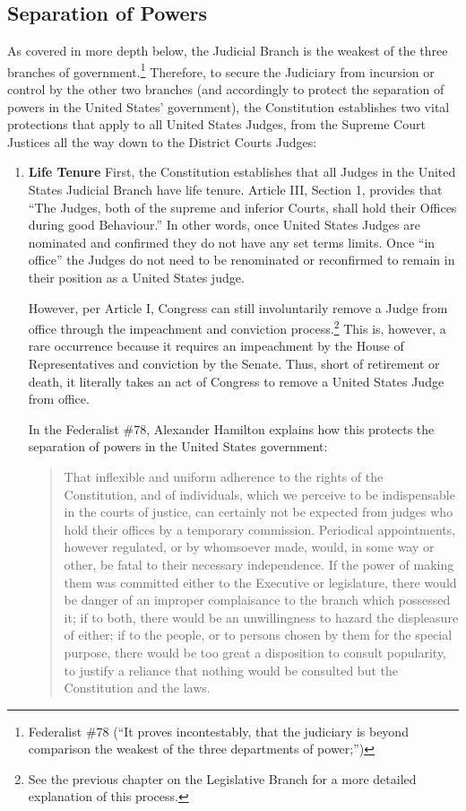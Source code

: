 \subsection{Separation of Powers}
As covered in more depth below, the Judicial Branch is the weakest of the three branches of government.\footnote{Federalist \#78 (``It proves incontestably, that the judiciary is beyond comparison the weakest of the three departments of power;'')}  Therefore, to secure the Judiciary from incursion or control by the other two branches (and accordingly to protect the separation of powers in the United States' government), the Constitution establishes two vital protections that apply to all United States Judges, from the Supreme Court Justices all the way down to the District Courts Judges:

\begin{enumerate}
\item \textbf{Life Tenure}  First, the Constitution establishes that all Judges in the United States Judicial Branch have life tenure.  Article III, Section 1, provides that ``The Judges, both of the supreme and inferior Courts, shall hold their Offices during good Behaviour.''  In other words, once United States Judges are nominated and confirmed they do not have any set terms limits.  Once ``in office'' the Judges do not need to be renominated or reconfirmed to remain in their position as a United States judge.  

However, per Article I, Congress can still involuntarily remove a Judge from office through the impeachment and conviction process.\footnote{See the previous chapter on the Legislative Branch for a more detailed explanation of this process.}  This is, however, a rare occurrence because it requires an impeachment by the House of Representatives and conviction by the Senate.  Thus, short of retirement or death, it literally takes an act of Congress to remove a United States Judge from office.  

In the Federalist \#78, Alexander Hamilton explains how this protects the separation of powers in the United States government:

\begin{quote}
That inflexible and uniform adherence to the rights of the Constitution, and of individuals, which we perceive to be indispensable in the courts of justice, can certainly not be expected from judges who hold their offices by a temporary commission. Periodical appointments, however regulated, or by whomsoever made, would, in some way or other, be fatal to their necessary independence. If the power of making them was committed either to the Executive or legislature, there would be danger of an improper complaisance to the branch which possessed it; if to both, there would be an unwillingness to hazard the displeasure of either; if to the people, or to persons chosen by them for the special purpose, there would be too great a disposition to consult popularity, to justify a reliance that nothing would be consulted but the Constitution and the laws.
\end{quote}


\end{enumerate}
